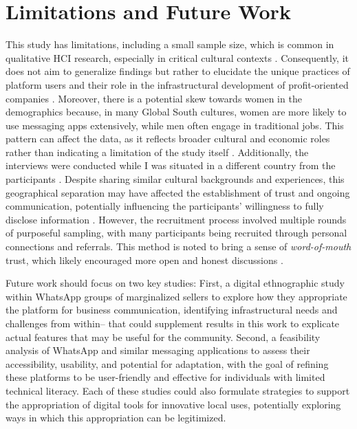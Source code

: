 \section{Limitations and Future Work}


This study has limitations, including a small sample size, which is common in qualitative HCI research, especially in critical cultural contexts \cite{eisenhart2009generalization}. Consequently, it does not aim to generalize findings but rather to elucidate the unique practices of platform users and their role in the infrastructural development of profit-oriented companies \cite{au2019thinking}. Moreover, there is a potential skew towards women in the demographics because, in many Global South cultures, women are more likely to use messaging apps extensively, while men often engage in traditional jobs. This pattern can affect the data, as it reflects broader cultural and economic roles rather than indicating a limitation of the study itself \cite{kantor2002sectoral}. Additionally, the interviews were conducted while I was situated in a different country from the participants \cite{Tuyisenge2023, Tarrant2013}. Despite sharing similar cultural backgrounds and experiences, this geographical separation may have affected the establishment of trust and ongoing communication, potentially influencing the participants' willingness to fully disclose information \cite{mullings1999insider}. However, the recruitment process involved multiple rounds of purposeful sampling, with many participants being recruited through personal connections and referrals. This method is noted to bring a sense of \textit{word-of-mouth} trust, which likely encouraged more open and honest discussions \cite{friedman2015qualitative}. 

Future work should focus on two key studies: First, a digital ethnographic study within WhatsApp groups of marginalized sellers to explore how they appropriate the platform for business communication, identifying infrastructural needs and challenges from within-- that could supplement results in this work to explicate actual features that may be useful for the community. Second, a feasibility analysis of WhatsApp and similar messaging applications to assess their accessibility, usability, and potential for adaptation, with the goal of refining these platforms to be user-friendly and effective for individuals with limited technical literacy. Each of these studies could also formulate strategies to support the appropriation of digital tools for innovative local uses, potentially exploring ways in which this appropriation can be legitimized.












